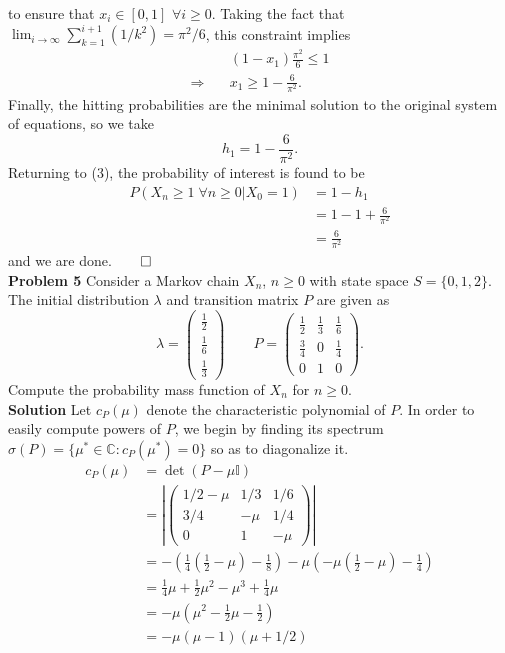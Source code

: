 \documentclass[11pt, letterpaper]{article}
\newcommand{\mbb}[1]{\mathbb{#1}}
\begin{document}
to ensure that $x_i\in[0,1]$ $\forall i\geq 0$. Taking the fact that $\lim_{i\rightarrow\infty}\sum_{k=1}^{i+1}(1/k^2)=\pi^2/6$, this constraint implies
\begin{align*}
    &(1-x_1)\frac{\pi^2}{6}\leq 1\\
    \Rightarrow\quad&x_1\geq 1-\frac{6}{\pi^2}.
\end{align*}
Finally, the hitting probabilities are the minimal solution to the original system of equations, so we take
\[h_1=1-\frac{6}{\pi^2}.\]
Returning to (3), the probability of interest is found to be
\begin{align*}
    P(X_n\geq 1\;\forall n\geq 0|X_0=1)&=1-h_1\\
    &=1-1+\frac{6}{\pi^2}\\
    &=\frac{6}{\pi^2}
\end{align*}
and we are done.\hfill{$\qed$}\\[10pt]
{\bf Problem 5} Consider a Markov chain $X_n$, $n\geq 0$ with state space $S=\{0,1,2\}$. The initial distribution $\lambda$ and transition matrix $P$ are given as 
\[\lambda=\begin{pmatrix}
    \frac{1}{2}\\[1.2pt]
    \frac{1}{6}\\[1.2pt]
    \frac{1}{3}
\end{pmatrix}\qquad P=\begin{pmatrix}
    \frac{1}{2} & \frac{1}{3} & \frac{1}{6}\\[1.2pt]
    \frac{3}{4} & 0 & \frac{1}{4}\\[1.2pt]
    0 & 1 & 0
\end{pmatrix}.\]
Compute the probability mass function of $X_n$ for $n\geq 0$.\\[10pt]
{\bf Solution} Let $c_P(\mu)$ denote the characteristic polynomial of $P$. In order to easily compute powers of $P$, we begin by finding its spectrum $\sigma (P)=\{\mu^\ast\in\mbb{C}:c_P(\mu^\ast)=0\}$ so as to diagonalize it.
\begin{align*}
    c_P(\mu)&=\det(P-\mu\mbb{I})\\
    &=\left|\begin{pmatrix}
        1/2-\mu & 1/3 & 1/6\\
        3/4 & -\mu & 1/4\\
        0 & 1 & -\mu
    \end{pmatrix}\right|\\
    &=-\left(\frac{1}{4}\left(\frac{1}{2}-\mu\right)-\frac{1}{8}\right)-\mu\left(-\mu\left(\frac{1}{2}-\mu\right)-\frac{1}{4}\right)\\
    &=\frac{1}{4}\mu+\frac{1}{2}\mu^2-\mu^3+\frac{1}{4}\mu\\
    &=-\mu\left(\mu^2-\frac{1}{2}\mu-\frac{1}{2}\right)\\
    &=-\mu(\mu-1)(\mu+1/2)
\end{align*}
\end{document}
